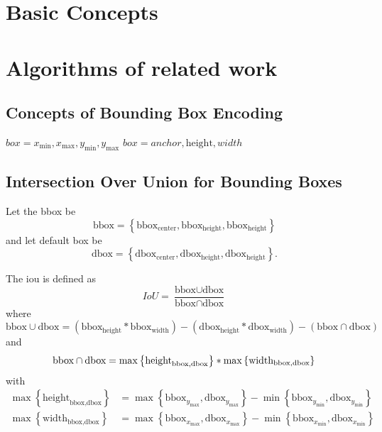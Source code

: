 \section{Basic Concepts}
\blindtext[1]

\section{Algorithms of related work}
\blindtext[2]

\subsection{Concepts of Bounding Box Encoding}\label{append:Concepts of Bounding Box Encoding}
\(box = {x_{\text{min}}, x_{\text{max}}, y_{\text{min}}, y_{\text{max}}}\)
\(box = {anchor, \text{height}, width}\)
\blindtext[1]

\subsection{Intersection Over Union for Bounding Boxes}\label{sect:Intersect Over Union}
Let the \gls{bbox} be 
\begin{equation}
    \text{bbox}=\left\{\text{bbox}_\text{center}, \text{bbox}_{\text{height}}, \text{bbox}_\text{height}\right\}
\end{equation}
and let default box be 
\begin{equation}
    \text{dbox}=\left\{\text{dbox}_\text{center}, \text{dbox}_\text{height}, \text{dbox}_\text{height}\right\}.
\end{equation}

The \gls{iou} is defined as
\begin{equation}
    IoU=\frac{\text{bbox}\cup \text{dbox}}{\text{bbox}\cap \text{dbox}}
\end{equation}
where
\begin{equation}
    \text{bbox}\cup \text{dbox}=\left(\text{bbox}_{\text{height}}*\text{bbox}_{\text{width}}\right) - \left(\text{dbox}_{\text{height}}*\text{dbox}_{\text{width}}\right) - \left(\text{bbox}\cap \text{dbox}\right)
\end{equation}
and
\begin{equation}
   \text{bbox}\cap \text{dbox} = \max\left\{\text{height}_{\text{bbox}, \text{dbox}}\right\}*\max\left\{\text{width}_{\text{bbox}, \text{dbox}}\right\}\\
\end{equation}
with
\begin{align}
    \max\left\{\text{height}_{\text{bbox}, \text{dbox}}\right\} &= \max\left\{\text{bbox}_{y_\text{max}}, \text{dbox}_{y_\text{max}}\right\}-\min\left\{\text{bbox}_{y_\text{min}}, \text{dbox}_{y_\text{min}}\right\}\\
    \max\left\{\text{width}_{\text{bbox}, \text{dbox}}\right\} &= \max\left\{\text{bbox}_{x_\text{max}}, \text{dbox}_{x_\text{max}}\right\}-\min\left\{\text{bbox}_{x_\text{min}}, \text{dbox}_{x_\text{min}}\right\}
\end{align}

